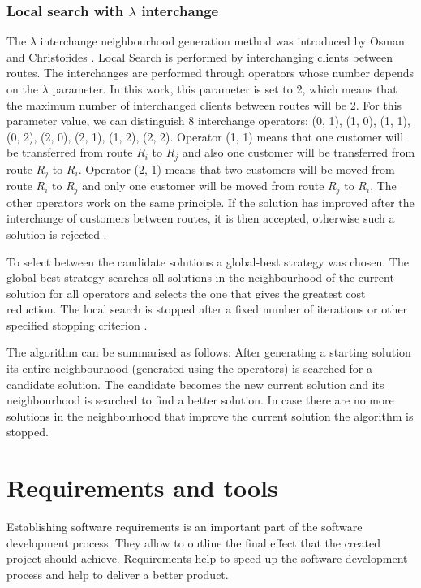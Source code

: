 \documentclass[a4paper,twoside,12pt]{book}
\begin{document}
\subsection{Local search with $\lambda$ interchange}
The $\lambda$ interchange neighbourhood generation method was introduced by Osman and Christofides \cite{bib:article:osman}. Local Search is performed by interchanging clients between routes. The interchanges are performed through operators whose number depends on the $\lambda$ parameter. In this work, this parameter is set to 2, which means that the maximum number of interchanged clients between routes will be 2. For this parameter value, we can distinguish 8 interchange operators: (0, 1), (1, 0), (1, 1), (0, 2), (2, 0), (2, 1), (1, 2), (2, 2). Operator (1, 1) means that one customer will be transferred from route $R_{i}$ to $R_{j}$ and also one customer will be transferred from route $R_{j}$ to $R_{i}$. Operator (2, 1) means that two customers will be moved from route $R_{i}$ to $R_{j}$ and only one customer will be moved from route $R_{j}$ to $R_{i}$. The other operators work on the same principle. If the solution has improved after the interchange of customers between routes, it is then accepted, otherwise such a solution is rejected \cite{bib:article:LocalSearchLambda}. 

To select between the candidate solutions a global-best strategy was chosen. The global-best strategy searches all solutions in the neighbourhood of the current solution for all operators and selects the one that gives the greatest cost reduction. The local search is stopped after a fixed number of iterations or other specified stopping criterion \cite{bib:article:LocalSearchLambda}. 

The algorithm can be summarised as follows: After generating a starting solution its entire neighbourhood (generated using the operators) is searched for a candidate solution. The candidate becomes the new current solution and its neighbourhood is searched to find a better solution. In case there are no more solutions in the neighbourhood that improve the current solution the algorithm is stopped.


\chapter{Requirements and tools}

Establishing software requirements is an important part of the software development process. They allow to outline the final effect that the created project should achieve. Requirements help to speed up the software development process and help to deliver a better product. 
\end{document}
